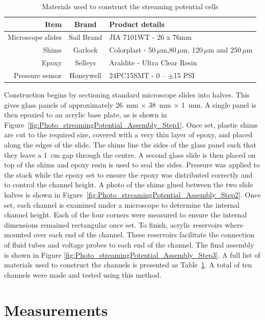       \begin{table}
        \begin{tabular}{r|c|l}
          Item & Brand & Product details\tabularnewline\hline
          Microscope slides & Sail Brand & JIA 7101WT - 26 x 76mm\tabularnewline
          Shims & Garlock & Colorplast - 50$\,\mu$m,80$\,\mu$m, 120$\,\mu$m and 250$\,\mu$m\tabularnewline
          Epoxy & Selleys & Araldite - Ultra Clear Resin\tabularnewline
          Pressure sensor & Honeywell & 24PC15SMT - 0 -- $\pm$15 PSI\tabularnewline
        \end{tabular}
        \caption{\label{Table_StreamingCell_MaterialsUsed}Materials used to construct the streaming potential cells}
      \end{table}
      Construction begins by sectioning standard microscope slides into halves.
      This gives glass panels of approximately \SI{26}{\milli\meter} $\times$ \SI{38}{\milli\meter} $\times$ \SI{1}{\milli\meter}.
      A single panel is then epoxied to an acrylic base plate, as is shown in Figure~\ref{fig:Photo_streamingPotential_Assembly_Step1}.
      Once set, plastic shims are cut to the required size, covered with a very thin layer of epoxy, and placed along the edges of the slide.
      The shims line the sides of the glass panel such that they leave a \SI{1}{\centi\meter} gap through the centre.
      A second glass slide is then placed on top of the shims and epoxy resin is used to seal the sides.
      Pressure was applied to the stack while the epoxy set to ensure the epoxy was distributed correctly and to control the channel height.
      A photo of the shims glued between the two slide halves is shown in Figure~\ref{fig:Photo_streamingPotential_Assembly_Step2}.
      Once set, each channel is examined under a microscope to determine the internal channel height.
      Each of the four corners were measured to ensure the internal dimensions remained rectangular once set.
      To finish, acrylic reservoirs where mounted over each end of the channel.
      These reservoirs facilitate the connection of fluid tubes and voltage probes to each end of the channel.
      The final assembly is shown in Figure \ref{fig:Photo_streamingPotential_Assembly_Step3}.
      A full list of materials used to construct the channels is presented as Table~\ref{Table_StreamingCell_MaterialsUsed}.
      A total of ten channels were made and tested using this method.


\section{Measurements}
  \label{sect:part1_energyHarvesting_measuringStreamingCells}


